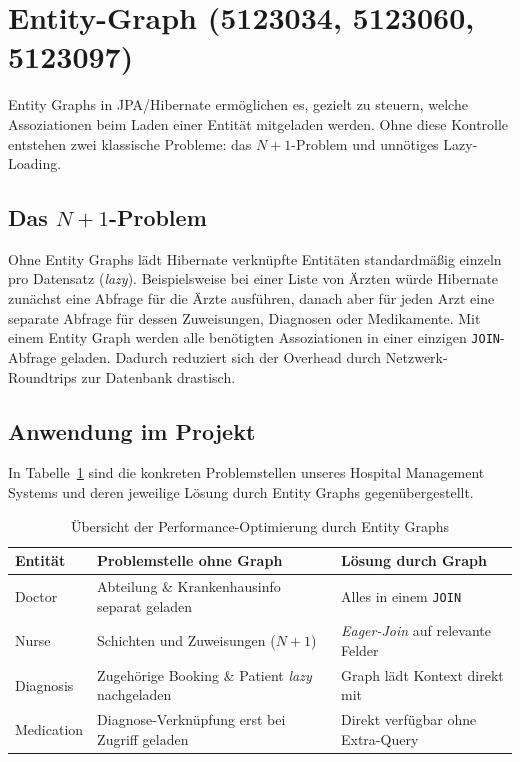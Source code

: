 \section{Entity-Graph (5123034, 5123060, 5123097)}
\label{sec:performance_entity_graphs}

Entity Graphs in JPA/Hibernate ermöglichen es, gezielt zu steuern, welche Assoziationen beim Laden einer Entität mitgeladen werden. 
Ohne diese Kontrolle entstehen zwei klassische Probleme: das $N+1$-Problem und unnötiges Lazy-Loading.

\subsection*{Das $N+1$-Problem}
Ohne Entity Graphs lädt Hibernate verknüpfte Entitäten standardmäßig einzeln pro Datensatz (\textit{lazy}). 
Beispielsweise bei einer Liste von Ärzten würde Hibernate zunächst eine Abfrage für die Ärzte ausführen, danach aber für jeden Arzt eine separate Abfrage für dessen Zuweisungen, Diagnosen oder Medikamente.
Mit einem Entity Graph werden alle benötigten Assoziationen in einer einzigen \texttt{JOIN}-Abfrage geladen. 
Dadurch reduziert sich der Overhead durch Netzwerk-Roundtrips zur Datenbank drastisch.

\subsection*{Anwendung im Projekt}
In Tabelle~\ref{tab:entity_graphs_anwendung} sind die konkreten Problemstellen unseres Hospital Management Systems und deren jeweilige Lösung durch Entity Graphs gegenübergestellt.

\begin{table}[H]
\centering
\small
\caption{Übersicht der Performance-Optimierung durch Entity Graphs}
\label{tab:entity_graphs_anwendung}
\begin{tabularx}{\textwidth}{l X X}
\hline
\textbf{Entität} & \textbf{Problemstelle ohne Graph} & \textbf{Lösung durch Graph} \\ \hline
Doctor & Abteilung \& Krankenhausinfo separat geladen & Alles in einem \texttt{JOIN} \\
Nurse & Schichten und Zuweisungen ($N+1$) & \textit{Eager-Join} auf relevante Felder \\
Diagnosis & Zugehörige Booking \& Patient \textit{lazy} nachgeladen & Graph lädt Kontext direkt mit \\
Medication & Diagnose-Verknüpfung erst bei Zugriff geladen & Direkt verfügbar ohne Extra-Query \\ \hline
\end{tabularx}
\end{table}

